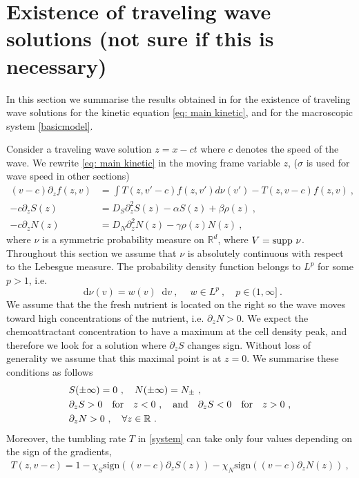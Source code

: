 \documentclass[11pt,twoside]{article}
\numberwithin{equation}{section}
\newcommand*\diff{\mathop{}\!\mathrm{d}}
\theoremstyle{plain}
\theoremstyle{nonumberplain}
\begin{document}
\iffalse
\section{Existence of traveling wave solutions (not sure if this is necessary)}

In this section we summarise the results obtained in \cite{calvez2019chemotactic} for the existence of traveling wave solutions for the kinetic equation \eqref{eq: main kinetic},  and for the macroscopic system \eqref{basicmodel}.

Consider a traveling wave solution $z=x-ct$ where $c$ denotes the speed of the wave. We rewrite \eqref{eq: main kinetic} in the moving frame variable $z$, {\color{red} ($\sigma$ is used for wave speed in other sections)}
\begin{equation}
\begin{aligned}\label{system}
(v-c)\partial_zf(z,v)&=\int T(z,v'-c)f(z,v')d\nu(v')-T(z,v-c)f(z,v)\ ,\\
-c\partial_z S(z)&=D_S\partial_{z}^2S(z)-\alpha S(z)+\beta \rho(z)\ ,\\
-c\partial_zN(z)&=D_N\partial_{z}^2N(z)-\gamma\rho(z) N(z)
\ ,
\end{aligned}
\end{equation}
where $\nu$ is a symmetric probability measure on $\mathbb{R}^d$, where $V=\textnormal{supp}\ \nu$. Throughout this section we assume that $\nu$ is absolutely continuous with respect to the Lebesgue measure. The probability density function belongs to $L^p$ for some $p > 1$, i.e.
\[
\diff \nu (v)=w(v)\diff v\ ,\ \quad w\in L^p\ , \quad p\in(1,\infty]\ .
\]
We assume that the the fresh nutrient is located on the right so the wave moves toward high concentrations of the nutrient, i.e.  $\partial_zN>0$. We expect the chemoattractant concentration to have a maximum at the cell density peak, and therefore we look for a solution where  $\partial_zS$ changes sign. Without loss of generality we assume that this maximal point is at $z=0$.  We summarise these conditions as follows
\begin{equation}
\begin{aligned}
 &S(\pm \infty)=0\ ,\quad N(\pm\infty)=N_\pm\ ,\\
&\partial_z S>0  \quad  \textrm{for}\quad z<0\ , \quad\textnormal{and}\quad\partial_z S<0 \quad \textrm{for}\quad z>0\ ,\\
&\partial_zN>0\ ,\quad\forall z\in\mathbb{R}\ .\label{eq: cond chemicals}
\end{aligned}
\end{equation}
Moreover, the tumbling rate $T$ in \eqref{system} can take only four values depending on the sign of the gradients,
\begin{eqnarray}\label{tumbl}
   T(z,v-c)=1-\chi_S \textrm{sign}((v-c)\partial_z S(z))-\chi_N \textrm{sign}((v-c)\partial_z N(z))\ ,
\end{eqnarray}
\end{document}
